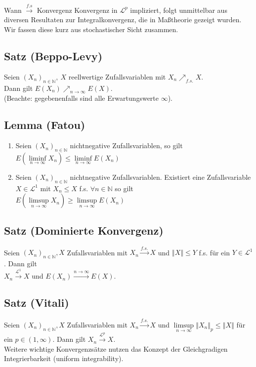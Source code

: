 \documentclass[german,10pt,oneside, fleqn, a4paper]{article}
\newcommand {\N}	{\mathbb{N}}
\newcommand{\lsup}[1][n]{\limsup\limits_{#1\rightarrow\infty}}
\newcommand{\linf}[1][n]{\liminf\limits_{#1\rightarrow\infty}}
\newcommand{\brc}[1]{\left(#1\right)}
\newcommand{\folge}[3][\N]{\left(#2_#3\right)_{#3\in #1}}
\newcommand{\norm}[1]{\left\Vert #1 \right\Vert}
\newcommand{\mc}[1]{\mathcal{#1}}
\newcommand{\1}[1]{1_{#1}}
\newcommand{\2}[1]{\1{\brac{#1}}}
\begin{document}
Wann $\xrightarrow{f.s}$ Konvergenz Konvergenz in $\mathcal{L}^p$ impliziert, folgt unmittelbar aus diversen Resultaten zur Integralkonvergenz, die in Maßtheorie gezeigt wurden. Wir fassen diese kurz aus stochastischer Sicht zusammen.
\subsection{Satz (Beppo-Levy)}
Seien $(X_n)_{n\in\N},\ X$ reellwertige Zufallsvariablen mit $X_n\nearrow_{f.s.}X$.\\ 
Dann gilt $E(X_n)\nearrow_{n\rightarrow\infty}E(X)$. \\(Beachte: gegebenenfalls sind alle Erwartungswerte $\infty$).




\subsection{Lemma (Fatou)}
\begin{enumerate}[label=(\alph*)]
\item Seien $\folge{X}{n}$ nichtnegative Zufallsvariablen, so gilt\\
$E\brc{\linf X_n}\leq\linf{E(X_n)}$
\item Seien $\folge{X}{n}$ nichtnegative Zufallsvariablen. Existiert eine Zufallsvariable  $X\in \mc{L}^1$ mit $X_n\leq X$ f.s. $\forall n\in\N$ so gilt \\
$E\brc{\lsup X_n}\geq\lsup{E\brc{X_n}}$
\end{enumerate}

\subsection{Satz (Dominierte Konvergenz)}
Seien $\folge{X}{n},X$ Zufallsvariablen mit $X_n\xrightarrow{f.s.}X$ und $\norm{X}\leq Y$ f.s. für ein $Y\in \mc{L}^1$. Dann gilt\\
$X_n\xrightarrow{\mathcal{L}^1}X$ und $E(X_n)\xrightarrow{n\rightarrow\infty}E(X)$.

\subsection{Satz (Vitali)}
Seien $\folge{X}{n},X$ Zufallsvariablen mit $X_n\xrightarrow{f.s.}X$ und $\lsup\norm{X_n}_p\leq\norm{X}$ für ein $p\in(1,\infty)$. Dann gilt $X_n\xrightarrow{\mathcal{L}^p}X$.\\
Weitere wichtige Konvergenzsätze nutzen das Konzept der Gleichgradigen Integrierbarkeit (uniform integrability).
\end{document}
